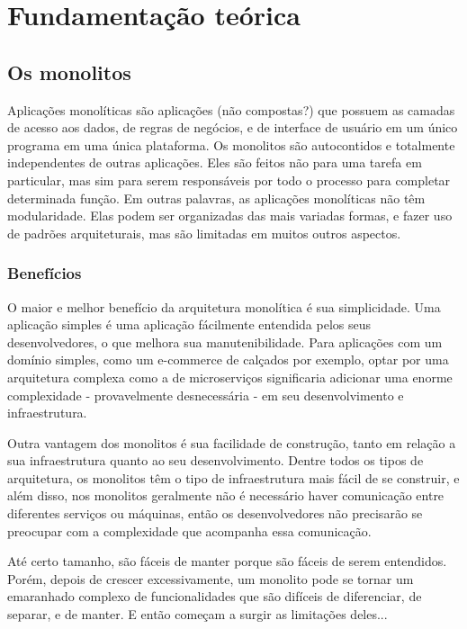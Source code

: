 \chapter{Fundamentação teórica}\label{cap_exemplos}


\section{Os monolitos}

Aplicações monolíticas são aplicações (não compostas?) que possuem as camadas de acesso aos dados, de regras de negócios, e de interface de usuário em um único programa em uma única plataforma. Os monolitos são autocontidos e totalmente independentes de outras aplicações. Eles são feitos não para uma tarefa em particular, mas sim para serem responsáveis por todo o processo para completar determinada função. Em outras palavras, as aplicações monolíticas não têm modularidade. Elas podem ser organizadas das mais variadas formas, e fazer uso de padrões arquiteturais, mas são limitadas em muitos outros aspectos.

\subsection{Benefícios}

O maior e melhor benefício da arquitetura monolítica é sua simplicidade. Uma aplicação simples é uma aplicação fácilmente entendida pelos seus desenvolvedores, o que melhora sua manutenibilidade. Para aplicações com um domínio simples, como um e-commerce de calçados por exemplo, optar por uma arquitetura complexa como a de microserviços significaria adicionar uma enorme complexidade - provavelmente desnecessária - em seu desenvolvimento e infraestrutura.

Outra vantagem dos monolitos é sua facilidade de construção, tanto em relação a sua infraestrutura quanto ao seu desenvolvimento. Dentre todos os tipos de arquitetura, os monolitos têm o tipo de infraestrutura mais fácil de se construir, e além disso, nos monolitos geralmente não é necessário haver comunicação entre diferentes serviços ou máquinas, então os desenvolvedores não precisarão se preocupar com a complexidade que acompanha essa comunicação.

Até certo tamanho, são fáceis de manter porque são fáceis de serem entendidos. Porém, depois de crescer excessivamente, um monolito pode se tornar um emaranhado complexo de funcionalidades que são difíceis de diferenciar, de separar, e de manter. E então começam a surgir as limitações deles...

